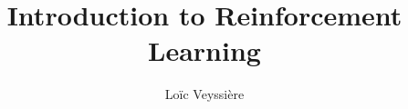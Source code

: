 \documentclass{article}
\begin{document}
\title{Introduction to Reinforcement Learning}
\author{Loïc Veyssière}

\maketitle


\end{document}
